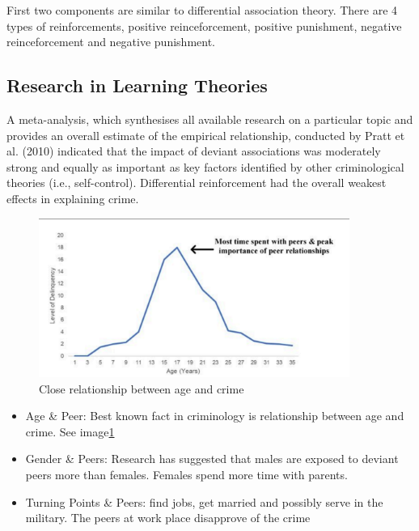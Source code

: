 \documentclass[11pt]{article}
\begin{document}
First two components are similar to differential association theory. There are 4 types of reinforcements, positive reinceforcement, positive punishment, negative reinceforcement and negative punishment.

\subsection{Research in Learning Theories}

A meta-analysis, which synthesises all available research on a particular topic and provides an overall estimate of the empirical relationship, conducted by Pratt et al. (2010) indicated that the impact of deviant associations was moderately strong and equally as important as key factors identified by other criminological theories (i.e., self-control). Differential reinforcement had the overall weakest effects in explaining crime.

\begin{figure}
    \begin{center}
        \includegraphics[width = 4in]{Age_Crime.png}
    \end{center}
    \caption{Close relationship between age and crime}
    \label{AgeCrime}
\end{figure}

\begin{itemize}
    \item Age \& Peer: Best known fact in criminology is relationship between age and crime. See image\ref{AgeCrime}
    
    \item Gender \& Peers: Research has suggested that males are exposed to deviant peers more than females. Females spend more time with parents.
    
    \item Turning Points \& Peers: find jobs, get married and possibly serve in the military. The peers at work place disapprove of the crime
\end{itemize}
\end{document}
